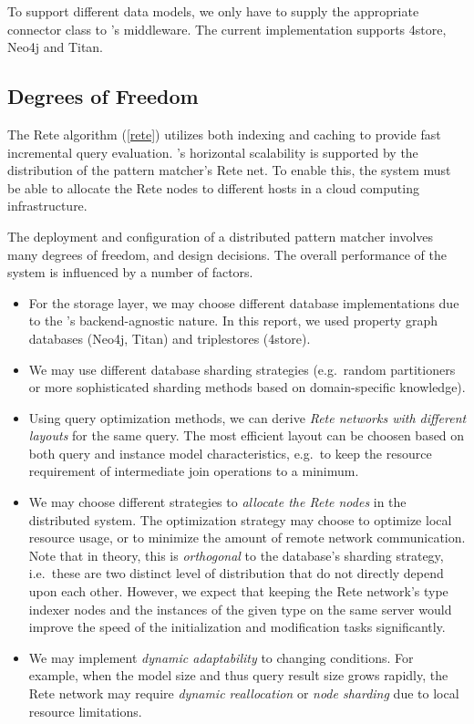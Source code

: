 To support different data models, we only have to supply the appropriate connector class to \iqd{}'s middleware. The current implementation supports 4store, Neo4j and Titan. %


\subsection{Degrees of Freedom}
 
The Rete algorithm (\autoref{rete}) utilizes both indexing and caching to provide fast incremental query evaluation. \iqd{}'s horizontal scalability is supported by the distribution of the pattern matcher's Rete net. To enable this, the system must be able to allocate the Rete nodes to different hosts in a cloud computing infrastructure. 

The deployment and configuration of a distributed pattern matcher involves many degrees of freedom, and design decisions. The overall performance of the system is influenced by a number of factors.

\begin{itemize}
  \item For the storage layer, we may choose different database implementations due to the \iqd{}'s backend-agnostic nature. In this report, we used property graph databases (Neo4j, Titan) and triplestores (4store).
  \item We may use different database sharding strategies (e.g.\ random partitioners or more sophisticated sharding methods based on domain-specific knowledge).
  \item Using query optimization methods, we can derive \emph{Rete networks with different layouts} for the same query. The most efficient layout can be choosen based on both query and instance model characteristics, e.g.\ to keep the resource requirement of intermediate join operations to a minimum.
  \item We may choose different strategies to \emph{allocate the Rete nodes} in the distributed system. The optimization strategy may choose to optimize local resource usage, or to minimize the amount of remote network communication. Note that in theory, this is \emph{orthogonal} to the database's sharding strategy, i.e.\ these are two distinct level of distribution that do not directly depend upon each other. However, we expect that keeping the Rete network's type indexer nodes and the instances of the given type on the same server would improve the speed of the initialization and modification tasks significantly.
  \item We may implement \emph{dynamic adaptability} to changing conditions. For example, when the model size and thus query result size grows rapidly, the Rete network may require \emph{dynamic reallocation} or \emph{node sharding} due to local resource limitations.
\end{itemize}

